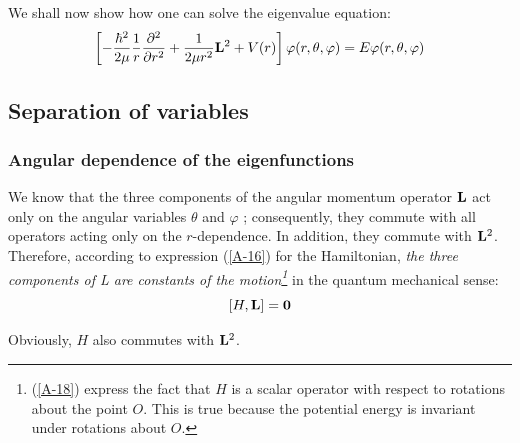 We shall now show how one can solve the eigenvalue equation:
\begin{equation}\label{A-17}
	\left[-\frac{\hbar^2}{2\mu}\frac{1}{r}\pdv[2]{r}+\frac{1}{2\mu r^2}\vb{L}^2+V(r)\right]\varphi(r,\theta,\varphi)=E\varphi(r,\theta,\varphi)
\end{equation}

\subsection{Separation of variables}
\subsubsection{Angular dependence of the eigenfunctions}
We know that the three components of the angular momentum operator $\vb{L}$ act only on the angular variables $\theta$ and $\varphi$ ; consequently, they commute with all operators acting only on the $r$-dependence. In addition, they commute with $\vb{L}^2$. Therefore, according to expression (\ref{A-16}) for the Hamiltonian, \textit{the three components of L are constants of the motion\footnote{(\ref{A-18}) express the fact that $H$ is a scalar operator with respect to rotations about the point $O$. This is true because the potential energy is invariant under rotations about $O$.}} in the quantum mechanical sense:
\begin{equation}\label{A-18}
	[H,\vb{L}]=\vb{0}
\end{equation}

Obviously, $H$ also commutes with $\vb{L}^2$.

